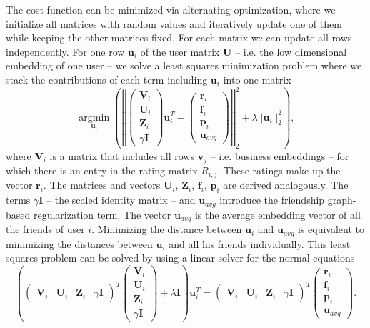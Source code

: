 \documentclass[a4paper]{article}
\begin{document}
The cost function can be minimized via alternating optimization, where we initialize all matrices with random values and iteratively update one of them while keeping the other matrices fixed. For each matrix we can update all rows independently. For one row $\mathbf{u}_i$ of the user matrix $\mathbf{U}$ -- i.e. the low dimensional embedding of one user -- we solve a least squares minimization problem where we stack the contributions of each term including $\mathbf{u}_i$ into one matrix
\begin{equation}
\underset{\mathbf{u}_i}{\operatorname{argmin}} \left(
\left| \left|
\begin{pmatrix}
  \mathbf{V}_i\\
  \mathbf{U}_i\\
  \mathbf{Z}_i \\
  \gamma \mathbf{I}
\end{pmatrix}
\mathbf{u}_i^T - 
\begin{pmatrix}
  \mathbf{r}_i \\
  \mathbf{f}_i \\
  \mathbf{p}_i \\
  \mathbf{u}_{avg}
\end{pmatrix}
\right| \right|_2^2
+ \lambda ||\mathbf{u}_i||_2^2 \right),
\end{equation}
where $\mathbf{V}_i$ is a matrix that includes all rows $\mathbf{v}_j$ -- i.e. business embeddings -- for which there is an entry in the rating matrix $R_{i,j}$. These ratings make up the vector $\mathbf{r}_i$. The matrices and vectors $\mathbf{U}_i$, $\mathbf{Z}_i$, $\mathbf{f}_i$, $\mathbf{p}_i$  are derived analogously. The terms $\gamma \mathbf{I}$ -- the scaled identity matrix -- and $\mathbf{u}_{avg}$ introduce the friendship graph-based regularization term. The vector $\mathbf{u}_{avg}$ is the average embedding vector of all the friends of user $i$. Minimizing the distance between $\mathbf{u}_i$ and $\mathbf{u}_{avg}$ is equivalent to minimizing the distances between $\mathbf{u}_i$ and all his friends individually. This least squares problem can be solved by using a linear solver for the normal equations
\begin{equation}
\left(
\begin{pmatrix}
  \mathbf{V}_i &
  \mathbf{U}_i &
  \mathbf{Z}_i &
  \gamma \mathbf{I}
\end{pmatrix}^T
\begin{pmatrix}
  \mathbf{V}_i\\
  \mathbf{U}_i\\
  \mathbf{Z}_i \\
  \gamma \mathbf{I}
\end{pmatrix}
+ \lambda \mathbf{I} \right)
\mathbf{u}_i^T
= 
\begin{pmatrix}
  \mathbf{V}_i &
  \mathbf{U}_i &
  \mathbf{Z}_i &
  \gamma \mathbf{I}
\end{pmatrix}^T
\begin{pmatrix}
  \mathbf{r}_i \\
  \mathbf{f}_i \\
  \mathbf{p}_i \\
  \mathbf{u}_{avg}
\end{pmatrix}.
\end{equation}
\end{document}
